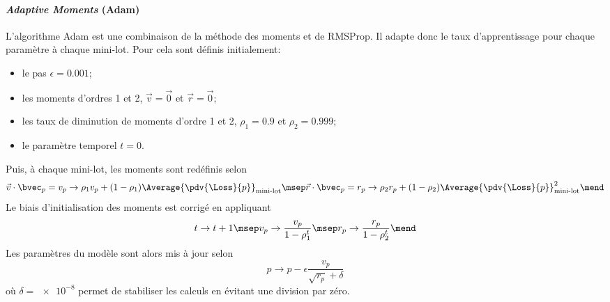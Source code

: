 \paragraph{\emph{Adaptive Moments} (Adam)} \cite{adam,DNN}
L'algorithme Adam
est une combinaison
de la méthode des moments
et
de RMSProp.
Il adapte donc le taux d'apprentissage pour chaque paramètre à chaque mini-lot.
Pour cela sont définis initialement:
\begin{itemize}
\item le pas $\epsilon=\num{0.001}$;
\item les moments d'ordres 1 et 2, $\vec{v}=\vec{0}$ et $\vec{r}=\vec{0}$;
\item les taux de diminution de moments d'ordre 1 et 2, $\rho_1=\num{0.9}$ et $\rho_2=\num{0.999}$;
\item le paramètre temporel $t=0$.
\end{itemize}
Puis, à chaque mini-lot, les moments sont redéfinis selon
\begin{equation}
\vec{v}\cdot\bvec_p =
v_p \to \rho_1 v_p + (1-\rho_1) \Average{\pdv{\Loss}{p}}_\text{mini-lot}
\msep
\vec{r}\cdot\bvec_p =
r_p \to \rho_2 r_p + (1-\rho_2) \Average{\pdv{\Loss}{p}}_\text{mini-lot}^2
\mend
\end{equation}
Le biais d'initialisation des moments est corrigé en appliquant
\begin{equation}
t \to t+1
\msep
v_p \to \frac{v_p}{1-\rho_1^t}
\msep
r_p \to \frac{r_p}{1-\rho_2^t}
\mend
\end{equation}
Les paramètres du modèle sont alors mis à jour selon
\begin{equation}
p \to p - \epsilon \frac{v_p}{\sqrt{r_p}+\delta}
\end{equation}
où
$\delta=\num{e-8}$ permet de stabiliser les calculs en évitant une division par zéro.

